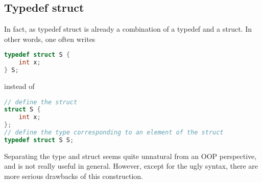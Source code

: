 \documentclass{scrartcl}
\begin{document}
\subsection{Typedef struct}
In fact, as typedef struct is already a combination of a typedef and a struct.
In other words, one often writes
\begin{lstlisting}[language = c]
typedef struct S { 
    int x; 
} S;
\end{lstlisting}
instead of
\begin{lstlisting}[language = c]
// define the struct
struct S {
    int x; 
};
// define the type corresponding to an element of the struct
typedef struct S S;
\end{lstlisting}
Separating the type and struct seems quite unnatural from an OOP perspective, and is not really useful in general.
However, except for the ugly syntax, there are more serious drawbacks of this construction.
\end{document}
